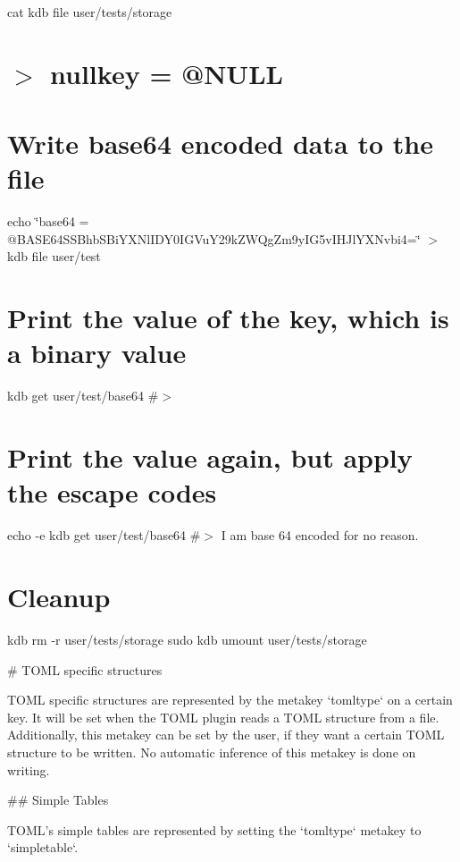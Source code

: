 cat {\ttfamily kdb file user/tests/storage} \hypertarget{autotoc_md693_autotoc_md752}{}\section{$>$ nullkey = \textquotesingle{}@\+N\+U\+L\+L\textquotesingle{}}\label{autotoc_md693_autotoc_md752}
\hypertarget{autotoc_md693_autotoc_md753}{}\section{Write base64 encoded data to the file}\label{autotoc_md693_autotoc_md753}
echo \char`\"{}base64 = \textquotesingle{}@\+B\+A\+S\+E64\+S\+S\+Bhb\+S\+Bi\+Y\+X\+Nl\+I\+D\+Y0\+I\+G\+Vu\+Y29k\+Z\+W\+Qg\+Zm9y\+I\+G5v\+I\+H\+Jl\+Y\+X\+Nvbi4=\textquotesingle{}\char`\"{} $>$ {\ttfamily kdb file user/test}\hypertarget{autotoc_md693_autotoc_md754}{}\section{Print the value of the key, which is a binary value}\label{autotoc_md693_autotoc_md754}
kdb get \textquotesingle{}user/test/base64\textquotesingle{} \#$>$ \hypertarget{autotoc_md693_autotoc_md755}{}\section{Print the value again, but apply the escape codes}\label{autotoc_md693_autotoc_md755}
echo -\/e {\ttfamily kdb get \textquotesingle{}user/test/base64\textquotesingle{}} \#$>$ I am base 64 encoded for no reason.\hypertarget{autotoc_md693_autotoc_md756}{}\section{Cleanup}\label{autotoc_md693_autotoc_md756}
kdb rm -\/r user/tests/storage sudo kdb umount user/tests/storage 
\begin{DoxyCode}
# TOML specific structures

TOML specific structures are represented by the metakey `tomltype` on a certain key.
It will be set when the TOML plugin reads a TOML structure from a file. Additionally, this metakey can be
       set by the user, if they want a certain TOML structure to be written.
No automatic inference of this metakey is done on writing.

## Simple Tables

TOML's simple tables are represented by setting the `tomltype` metakey to `simpletable`.
\end{DoxyCode}
